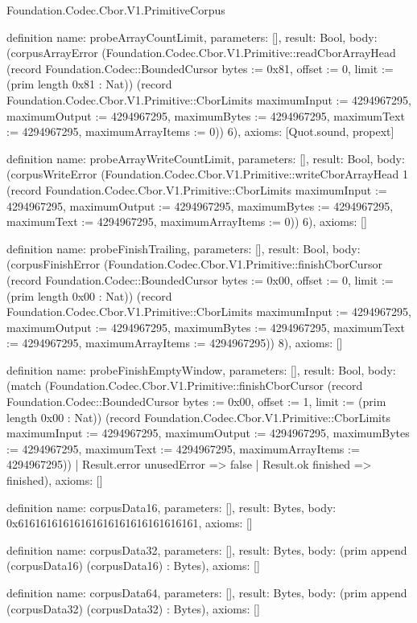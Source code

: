 \begin{lexlean}{Foundation.Codec.Cbor.V1.PrimitiveCorpus}
\begin{semanticmodule}
definition{
  name: probeArrayCountLimit,
  parameters: [],
  result: Bool,
  body: (corpusArrayError (Foundation.Codec.Cbor.V1.Primitive::readCborArrayHead (record Foundation.Codec::BoundedCursor {bytes := 0x81, offset := 0, limit := (prim length 0x81 : Nat)}) (record Foundation.Codec.Cbor.V1.Primitive::CborLimits {maximumInput := 4294967295, maximumOutput := 4294967295, maximumBytes := 4294967295, maximumText := 4294967295, maximumArrayItems := 0})) 6),
  axioms: [Quot.sound, propext]
}

definition{
  name: probeArrayWriteCountLimit,
  parameters: [],
  result: Bool,
  body: (corpusWriteError (Foundation.Codec.Cbor.V1.Primitive::writeCborArrayHead 1 (record Foundation.Codec.Cbor.V1.Primitive::CborLimits {maximumInput := 4294967295, maximumOutput := 4294967295, maximumBytes := 4294967295, maximumText := 4294967295, maximumArrayItems := 0})) 6),
  axioms: []
}

definition{
  name: probeFinishTrailing,
  parameters: [],
  result: Bool,
  body: (corpusFinishError (Foundation.Codec.Cbor.V1.Primitive::finishCborCursor (record Foundation.Codec::BoundedCursor {bytes := 0x00, offset := 0, limit := (prim length 0x00 : Nat)}) (record Foundation.Codec.Cbor.V1.Primitive::CborLimits {maximumInput := 4294967295, maximumOutput := 4294967295, maximumBytes := 4294967295, maximumText := 4294967295, maximumArrayItems := 4294967295})) 8),
  axioms: []
}

definition{
  name: probeFinishEmptyWindow,
  parameters: [],
  result: Bool,
  body: (match (Foundation.Codec.Cbor.V1.Primitive::finishCborCursor (record Foundation.Codec::BoundedCursor {bytes := 0x00, offset := 1, limit := (prim length 0x00 : Nat)}) (record Foundation.Codec.Cbor.V1.Primitive::CborLimits {maximumInput := 4294967295, maximumOutput := 4294967295, maximumBytes := 4294967295, maximumText := 4294967295, maximumArrayItems := 4294967295}))
    | Result.error unusedError => false
    | Result.ok finished => finished),
  axioms: []
}

definition{
  name: corpusData16,
  parameters: [],
  result: Bytes,
  body: 0x61616161616161616161616161616161,
  axioms: []
}

definition{
  name: corpusData32,
  parameters: [],
  result: Bytes,
  body: (prim append (corpusData16) (corpusData16) : Bytes),
  axioms: []
}

definition{
  name: corpusData64,
  parameters: [],
  result: Bytes,
  body: (prim append (corpusData32) (corpusData32) : Bytes),
  axioms: []
}


\end{semanticmodule}
\end{lexlean}
